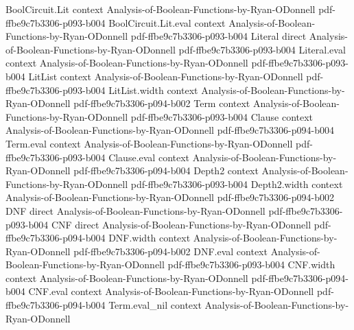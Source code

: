 \begin{lemma}
\leanok
{}
\proofstep
  {BoolCircuit.Lit}
  {context}
  {Analysis-of-Boolean-Functions-by-Ryan-ODonnell}
  {pdf-ffbe9c7b3306-p093-b004}
\proofstep
  {BoolCircuit.Lit.eval}
  {context}
  {Analysis-of-Boolean-Functions-by-Ryan-ODonnell}
  {pdf-ffbe9c7b3306-p093-b004}
\proofstep
  {Literal}
  {direct}
  {Analysis-of-Boolean-Functions-by-Ryan-ODonnell}
  {pdf-ffbe9c7b3306-p093-b004}
\proofstep
  {Literal.eval}
  {context}
  {Analysis-of-Boolean-Functions-by-Ryan-ODonnell}
  {pdf-ffbe9c7b3306-p093-b004}
\proofstep
  {LitList}
  {context}
  {Analysis-of-Boolean-Functions-by-Ryan-ODonnell}
  {pdf-ffbe9c7b3306-p093-b004}
\proofstep
  {LitList.width}
  {context}
  {Analysis-of-Boolean-Functions-by-Ryan-ODonnell}
  {pdf-ffbe9c7b3306-p094-b002}
\proofstep
  {Term}
  {context}
  {Analysis-of-Boolean-Functions-by-Ryan-ODonnell}
  {pdf-ffbe9c7b3306-p093-b004}
\proofstep
  {Clause}
  {context}
  {Analysis-of-Boolean-Functions-by-Ryan-ODonnell}
  {pdf-ffbe9c7b3306-p094-b004}
\proofstep
  {Term.eval}
  {context}
  {Analysis-of-Boolean-Functions-by-Ryan-ODonnell}
  {pdf-ffbe9c7b3306-p093-b004}
\proofstep
  {Clause.eval}
  {context}
  {Analysis-of-Boolean-Functions-by-Ryan-ODonnell}
  {pdf-ffbe9c7b3306-p094-b004}
\proofstep
  {Depth2}
  {context}
  {Analysis-of-Boolean-Functions-by-Ryan-ODonnell}
  {pdf-ffbe9c7b3306-p093-b004}
\proofstep
  {Depth2.width}
  {context}
  {Analysis-of-Boolean-Functions-by-Ryan-ODonnell}
  {pdf-ffbe9c7b3306-p094-b002}
\proofstep
  {DNF}
  {direct}
  {Analysis-of-Boolean-Functions-by-Ryan-ODonnell}
  {pdf-ffbe9c7b3306-p093-b004}
\proofstep
  {CNF}
  {direct}
  {Analysis-of-Boolean-Functions-by-Ryan-ODonnell}
  {pdf-ffbe9c7b3306-p094-b004}
\proofstep
  {DNF.width}
  {context}
  {Analysis-of-Boolean-Functions-by-Ryan-ODonnell}
  {pdf-ffbe9c7b3306-p094-b002}
\proofstep
  {DNF.eval}
  {context}
  {Analysis-of-Boolean-Functions-by-Ryan-ODonnell}
  {pdf-ffbe9c7b3306-p093-b004}
\proofstep
  {CNF.width}
  {context}
  {Analysis-of-Boolean-Functions-by-Ryan-ODonnell}
  {pdf-ffbe9c7b3306-p094-b004}
\proofstep
  {CNF.eval}
  {context}
  {Analysis-of-Boolean-Functions-by-Ryan-ODonnell}
  {pdf-ffbe9c7b3306-p094-b004}
\proofstep
  {Term.eval_nil}
  {context}
  {Analysis-of-Boolean-Functions-by-Ryan-ODonnell}

\end{lemma}

